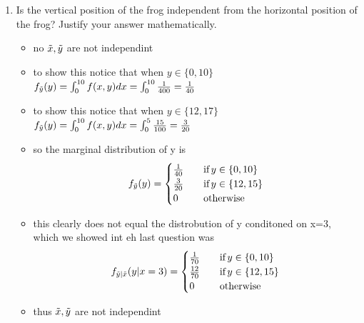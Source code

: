 \documentclass[12pt,twoside]{article}
\begin{document}
\begin{enumerate}
\begin{enumerate}
\item Is the vertical position of the frog independent from the horizontal position of the frog? Justify your answer mathematically. 
\begin{itemize}
    \item no $\Tilde{x}, \Tilde{y}$ are not independint 
    \item to show this notice that when $y\in\{0,10\}$ $f_{\Tilde{y}}(y)=\int_{0}^{10}f(x,y)dx=\int_{0}^{10}\frac{1}{400}=\frac{1}{40}$
    \item to show this notice that when $y\in\{12,17\}$ $f_{\Tilde{y}}(y)=\int_{0}^{10}f(x,y)dx=\int_{0}^{5}\frac{15}{100}=\frac{3}{20}$
    \item so the marginal distribution of y is 
        \begin{equation*}
f_{\Tilde{y}}(y)=\begin{cases}
          \frac{1}{40} \quad &\text{if} \, y \in \{0,10\} \\
                \frac{3}{20} \quad &\text{if} \, y \in \{12,15\}\\
                0 \quad & \text{otherwise}
     \end{cases}
\end{equation*}
\item this clearly does not equal the distrobution of y conditoned on x=3, which we showed int eh last question was 
    \begin{equation*}
f_{\Tilde{y}|\Tilde{x}}(y|x=3)=\begin{cases}
          \frac{1}{70} \quad &\text{if} \, y \in \{0,10\} \\
                \frac{12}{70} \quad &\text{if} \, y \in \{12,15\}\\
                0 \quad & \text{otherwise}
     \end{cases}
\end{equation*}
\item thus $\Tilde{x},\Tilde{y}$ are not independint 
\end{itemize}


\end{enumerate}
\end{enumerate}
\end{document}
